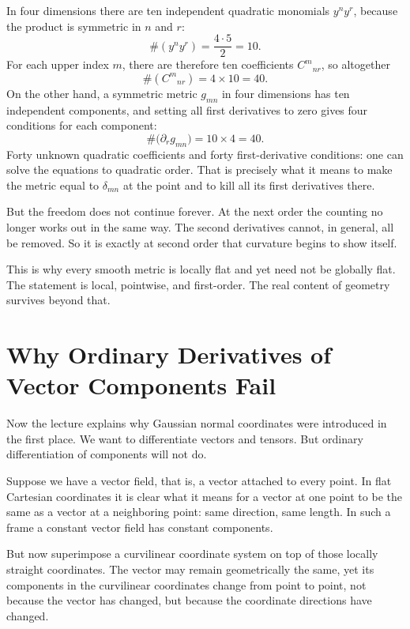In four dimensions there are ten independent quadratic monomials \(y^n y^r\), because the product is symmetric in \(n\) and \(r\):
\begin{equation}
\#(y^n y^r)=\frac{4\cdot 5}{2}=10.
\end{equation}
For each upper index \(m\), there are therefore ten coefficients \(C^m{}_{nr}\), so altogether
\begin{equation}
\#(C^m{}_{nr})=4\times 10=40.
\end{equation}
On the other hand, a symmetric metric \(g_{mn}\) in four dimensions has ten independent components, and setting all first derivatives to zero gives four conditions for each component:
\begin{equation}
\#\bigl(\partial_r g_{mn}\bigr)=10\times 4=40.
\end{equation}
Forty unknown quadratic coefficients and forty first-derivative conditions: one can solve the equations to quadratic order. That is precisely what it means to make the metric equal to \(\delta_{mn}\) at the point and to kill all its first derivatives there.

But the freedom does not continue forever. At the next order the counting no longer works out in the same way. The second derivatives cannot, in general, all be removed. So it is exactly at second order that curvature begins to show itself.

This is why every smooth metric is locally flat and yet need not be globally flat. The statement is local, pointwise, and first-order. The real content of geometry survives beyond that.

\section{Why Ordinary Derivatives of Vector Components Fail}

Now the lecture explains why Gaussian normal coordinates were introduced in the first place. We want to differentiate vectors and tensors. But ordinary differentiation of components will not do.

Suppose we have a vector field, that is, a vector attached to every point. In flat Cartesian coordinates it is clear what it means for a vector at one point to be the same as a vector at a neighboring point: same direction, same length. In such a frame a constant vector field has constant components.

But now superimpose a curvilinear coordinate system on top of those locally straight coordinates. The vector may remain geometrically the same, yet its components in the curvilinear coordinates change from point to point, not because the vector has changed, but because the coordinate directions have changed.

